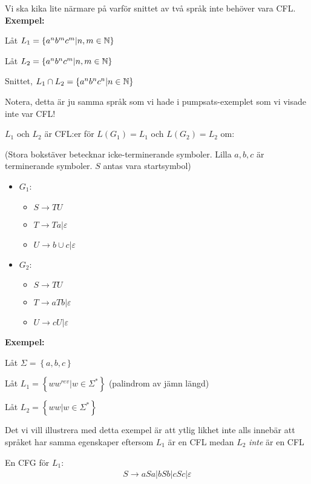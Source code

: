\par\bigskip
\noindent Vi ska kika lite närmare på varför snittet av två språk inte behöver vara CFL.
\newpage
\noindent\textbf{Exempel:}\par
\noindent Låt $L_1 = \left\{a^nb^mc^m|n,m\in\mathbb{N}\right\}$\par
\noindent Låt $L_2 = \left\{a^nb^nc^m|n,m\in\mathbb{N}\right\}$\par
\noindent Snittet, $L_1\cap L_2 = \left\{a^nb^nc^n|n\in\mathbb{N}\right\}$\par
\noindent Notera, detta är ju samma språk som vi hade i pumpsats-exemplet som vi visade inte var CFL!
\par\bigskip
\noindent $L_1$ och $L_2$ är CFL:er för $L(G_1) = L_1$ och $L(G_2) = L_2$ om:\par
\noindent (Stora bokstäver betecknar icke-terminerande symboler. Lilla $a,b,c$ är terminerande symboler. $S$ antas vara startsymbol)
\begin{itemize}
  \item $G_1$:
    \begin{itemize}
      \item $S\to TU$
      \item $T\to Ta|\varepsilon$
      \item $U\to b\cup c|\varepsilon$
    \end{itemize}
  \item $G_2$:
    \begin{itemize}
      \item $S\to TU$
      \item $T\to aTb|\varepsilon$
      \item $U\to cU|\varepsilon$
    \end{itemize}
\end{itemize}
\par\bigskip
\noindent\textbf{Exempel:}\par
\noindent Låt $\Sigma = \left\{a,b,c\right\}$\par
\noindent Låt $L_1 = \left\{ww^{rev}|w\in\Sigma^*\right\}$ (palindrom av jämn längd)\par
\noindent Låt $L_2 = \left\{ww|w\in\Sigma^*\right\}$
\par\bigskip
\noindent Det vi vill illustrera med detta exempel är att ytlig likhet inte alls innebär att språket har samma egenskaper eftersom $L_1$ är en CFL medan $L_2$ \textit{inte} är en CFL
\par\bigskip
\noindent En CFG för $L_1$:
\begin{equation*}
  \begin{gathered}
    S\to aSa|bSb|cSc|\varepsilon
  \end{gathered}
\end{equation*}
